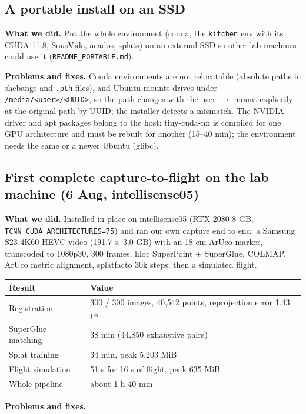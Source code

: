 \documentclass[11pt,a4paper]{article}
\newcommand{\code}[1]{\texttt{#1}}
\begin{document}
\subsection{A portable install on an SSD}
\textbf{What we did.} Put the whole environment (conda, the \code{kitchen} env with its CUDA 11.8, SousVide, acados, splats) on an external SSD so other lab machines could use it (\code{README\_\allowbreak{}PORTABLE.md}).

\textbf{Problems and fixes.} Conda environments are not relocatable (absolute paths in shebangs and \code{.pth} files), and Ubuntu mounts drives under \code{/\allowbreak{}media/\allowbreak{}<user>/\allowbreak{}<UUID>}, so the path changes with the user $\rightarrow$ mount explicitly at the original path by UUID; the installer detects a mismatch. The NVIDIA driver and apt packages belong to the host; tiny-cuda-nn is compiled for one GPU architecture and must be rebuilt for another (15–40 min); the environment needs the same or a newer Ubuntu (glibc).

\subsection{First complete capture-to-flight on the lab machine (6 Aug, intellisense05)}
\textbf{What we did.} Installed in place on intellisense05 (RTX 2080 8 GB, \code{TCNN\_\allowbreak{}CUDA\_\allowbreak{}ARCHITECTURES=75}) and ran our own capture end to end: a Samsung S23 4K60 HEVC video (191.7 s, 3.0 GB) with an 18 cm ArUco marker, transcoded to 1080p30, 300 frames, hloc SuperPoint + SuperGlue, COLMAP, ArUco metric alignment, splatfacto 30k steps, then a simulated flight.

\begin{center}\small
\begin{tabular}{@{}ll@{}}
\toprule
\textbf{Result} & \textbf{Value} \\
\midrule
Registration & 300 / 300 images, 40,542 points, reprojection error 1.43 px \\
SuperGlue matching & 38 min (44,850 exhaustive pairs) \\
Splat training & 34 min, peak 5,203 MiB \\
Flight simulation & 51 s for 16 s of flight, peak 635 MiB \\
Whole pipeline & about 1 h 40 min \\
\bottomrule
\end{tabular}
\end{center}
\textbf{Problems and fixes.}
\end{document}
